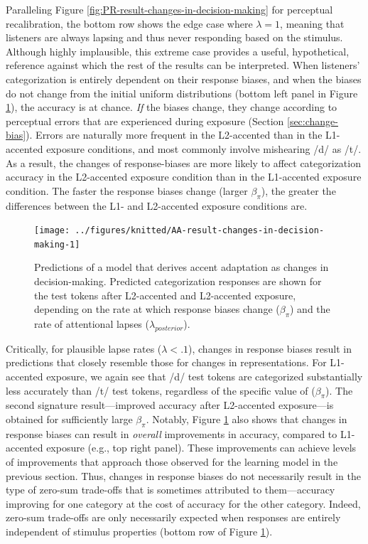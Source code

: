 \documentclass[
  11pt,
  man,floatsintext]{apa6}
\begin{document}
Paralleling Figure \ref{fig:PR-result-changes-in-decision-making} for perceptual recalibration, the bottom row shows the edge case where \(\lambda=1\), meaning that listeners are always lapsing and thus never responding based on the stimulus. Although highly implausible, this extreme case provides a useful, hypothetical, reference against which the rest of the results can be interpreted. When listeners' categorization is entirely dependent on their response biases, and when the biases do not change from the initial uniform distributions (bottom left panel in Figure \ref{fig:AA-result-changes-in-decision-making}), the accuracy is at chance. \emph{If} the biases change, they change according to perceptual errors that are experienced during exposure (Section \ref{sec:change-bias}). Errors are naturally more frequent in the L2-accented than in the L1-accented exposure conditions, and most commonly involve mishearing /d/ as /t/. As a result, the changes of response-biases are more likely to affect categorization accuracy in the L2-accented exposure condition than in the L1-accented exposure condition. The faster the response biases change (larger \(\beta_{\pi}\)), the greater the differences between the L1- and L2-accented exposure conditions are.



\begin{figure}

{\centering \texttt{[image: ../figures/knitted/AA-result-changes-in-decision-making-1]} 

}

\caption{Predictions of a model that derives accent adaptation as changes in decision-making. Predicted categorization responses are shown for the test tokens after L2-accented and L2-accented exposure, depending on the rate at which response biases change (\(\beta_{\pi}\)) and the rate of attentional lapses (\(\lambda_{posterior}\)).}\label{fig:AA-result-changes-in-decision-making}
\end{figure}

Critically, for plausible lapse rates (\(\lambda < .1\)), changes in response biases result in predictions that closely resemble those for changes in representations. For L1-accented exposure, we again see that /d/ test tokens are categorized substantially less accurately than /t/ test tokens, regardless of the specific value of (\(\beta_{\pi}\)). The second signature result---improved accuracy after L2-accented exposure---is obtained for sufficiently large \(\beta_{\pi}\). Notably, Figure \ref{fig:AA-result-changes-in-decision-making} also shows that changes in response biases can result in \emph{overall} improvements in accuracy, compared to L1-accented exposure (e.g., top right panel). These improvements can achieve levels of improvements that approach those observed for the learning model in the previous section. Thus, changes in response biases do not necessarily result in the type of zero-sum trade-offs that is sometimes attributed to them---accuracy improving for one category at the cost of accuracy for the other category. Indeed, zero-sum trade-offs are only necessarily expected when responses are entirely independent of stimulus properties (bottom row of Figure \ref{fig:AA-result-changes-in-decision-making}).
\end{document}

